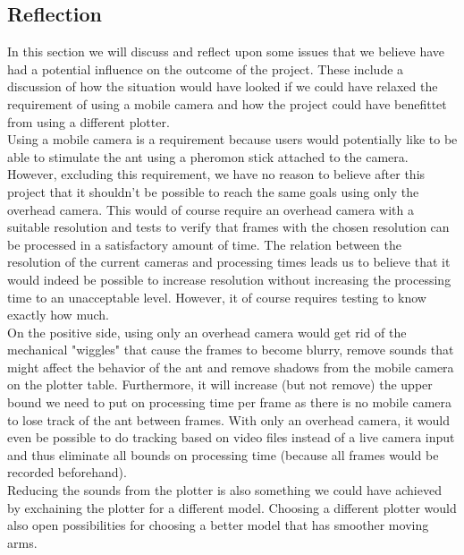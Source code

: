 
\subsection{Reflection}
In this section we will discuss and reflect upon some issues that we believe have had a potential influence on the outcome of the project. These include a discussion of how the situation would have looked if we could have relaxed the requirement of using a mobile camera and how the project could have benefittet from using a different plotter. \\

Using a mobile camera is a requirement because users would potentially like to be able to stimulate the ant using a pheromon stick attached to the camera. However, excluding this requirement, we have no reason to believe after this project that it shouldn't be possible to reach the same goals using only the overhead camera. This would of course require an overhead camera with a suitable resolution and tests to verify that frames with the chosen resolution can be processed in a satisfactory amount of time. The relation between the resolution of the current cameras and processing times leads us to believe that it would indeed be possible to increase resolution without increasing the processing time to an unacceptable level. However, it of course requires testing to know exactly how much. \\

On the positive side, using only an overhead camera would get rid of the mechanical "wiggles" that cause the frames to become blurry, remove sounds that might affect the behavior of the ant and remove shadows from the mobile camera on the plotter table. Furthermore, it will increase (but not remove) the upper bound we need to put on processing time per frame as there is no mobile camera to lose track of the ant between frames. With only an overhead camera, it would even be possible to do tracking based on   video files instead of a live camera input and thus eliminate all bounds on processing time (because all frames would be recorded beforehand). \\

Reducing the sounds from the plotter is also something we could have achieved by exchaining the plotter for a different model. Choosing a different plotter would also open possibilities for choosing a better model that has smoother moving arms.